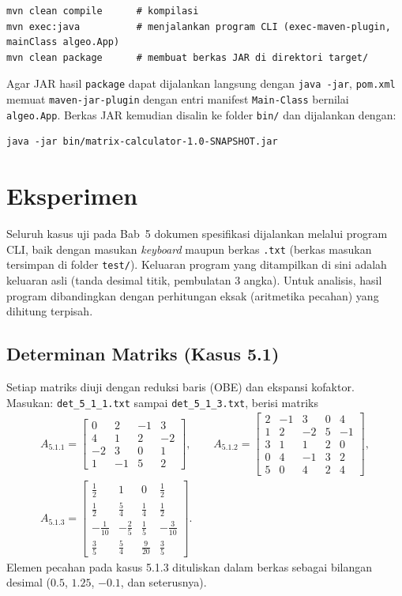 \documentclass[12pt,a4paper]{article}
\begin{document}
\begin{lstlisting}[language={}]
mvn clean compile      # kompilasi
mvn exec:java          # menjalankan program CLI (exec-maven-plugin, mainClass algeo.App)
mvn clean package      # membuat berkas JAR di direktori target/
\end{lstlisting}

Agar JAR hasil \texttt{package} dapat dijalankan langsung dengan \texttt{java -jar}, \texttt{pom.xml} memuat \texttt{maven-jar-plugin} dengan entri manifest \texttt{Main-Class} bernilai \texttt{algeo.App}. Berkas JAR kemudian disalin ke folder \texttt{bin/} dan dijalankan dengan:
\begin{lstlisting}[language={}]
java -jar bin/matrix-calculator-1.0-SNAPSHOT.jar
\end{lstlisting}

\section{Eksperimen}

Seluruh kasus uji pada Bab~5 dokumen spesifikasi dijalankan melalui program CLI, baik dengan masukan \textit{keyboard} maupun berkas \texttt{.txt} (berkas masukan tersimpan di folder \texttt{test/}). Keluaran program yang ditampilkan di sini adalah keluaran asli (tanda desimal titik, pembulatan 3 angka). Untuk analisis, hasil program dibandingkan dengan perhitungan eksak (aritmetika pecahan) yang dihitung terpisah.

\subsection{Determinan Matriks (Kasus 5.1)}
Setiap matriks diuji dengan reduksi baris (OBE) dan ekspansi kofaktor. Masukan: \texttt{det\_5\_1\_1.txt} sampai \texttt{det\_5\_1\_3.txt}, berisi matriks
\begin{gather*}
A_{5.1.1}=\begin{bmatrix}0&2&-1&3\\4&1&2&-2\\-2&3&0&1\\1&-1&5&2\end{bmatrix},\qquad
A_{5.1.2}=\begin{bmatrix}2&-1&3&0&4\\1&2&-2&5&-1\\3&1&1&2&0\\0&4&-1&3&2\\5&0&4&2&4\end{bmatrix},\\[4pt]
A_{5.1.3}=\begin{bmatrix}\frac12&1&0&\frac12\\[2pt] \frac12&\frac54&\frac14&\frac12\\[2pt] -\frac1{10}&-\frac25&\frac15&-\frac3{10}\\[2pt] \frac35&\frac54&\frac9{20}&\frac35\end{bmatrix}.
\end{gather*}
Elemen pecahan pada kasus 5.1.3 dituliskan dalam berkas sebagai bilangan desimal ($0.5$, $1.25$, $-0.1$, dan seterusnya).
\end{document}
